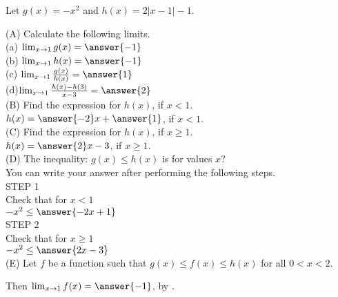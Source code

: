 \documentclass{ximera}
\author{Nela Lakos \and Kyle Parsons}
\begin{document}
\begin{exercise}

Let $g(x) = -x^2$ and $h(x) =  2\left|x-1\right|-1$.

(A) Calculate the following limits.\\[1em]
(a) $\lim_{x\to1}g(x) = \answer{-1}$\\

(b) $\lim_{x\to1}h(x)= \answer{-1}$\\

(c) $\lim_{x\to1}\frac{g(x)}{h(x)} = \answer{1}$\\ 

(d)$\lim_{x\to1}\frac{h(x)-h(3)}{x-3} = \answer{2}$\\[1em]


(B)  Find the expression for $h(x)$, if $x<1$.\\[1em]

$h(x)=\answer{-2}x +\answer{1}$,  if $x<1$. \\[1em]

(C)  Find the expression for $h(x)$, if $x\ge1$.\\[1em]

$h(x)=\answer{2}x -3$, if $x\ge1$.\\[1em]

(D) The inequality:   $g(x) \leq h(x)$    is  for  values $x$?\\[1em]
              You can write your answer after performing the following steps.\\[1em]
          STEP 1\\[1em]
     Check that for $x<1$ \\[1em]
     $-x^{2} \leq\answer{-2x+1}$ \\[1em]
      STEP 2\\[1em]
     Check that for $x\ge1$ \\[1em]
     $-x^{2} \leq\answer{2x-3}$\\[1em]
     
(E) Let $f$ be a function such that $g(x) \leq f(x) \leq h(x)$ for all $0 < x < 2$.

Then $\lim_{x\to1}f(x) = \answer{-1}$, by  .


\end{exercise}
\end{document}

